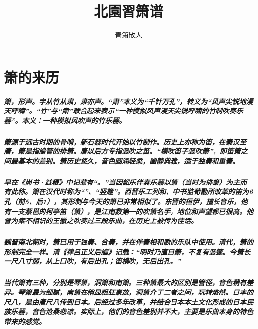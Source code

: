 \documentclass[cn,pad,twocol]{elegantbook}
\title{北園習箫谱}
\author{青箫散人}
\date{\zhtoday}
\begin{document}
\maketitle
\frontmatter
\tableofcontents
\mainmatter

\chapter{箫的来历}
\paragraph*{箫，形声。字从竹从肃，肃亦声。“肃”本义为“千针万孔”，转义为“风声尖锐地漫天呼啸”。“竹”与“肃”联合起来表示“一种模拟风声漫天尖锐呼啸的竹制吹奏乐器”。本义：一种模拟风吹声的竹乐器。}
\paragraph*{箫源于远古时期的骨哨，新石器时代开始以竹制作。历史上亦称为笛，在秦汉至唐，箫是指编管的排箫。唐以后方专指竖吹之笛。“横吹笛子竖吹箫”，即笛箫之间最基本的差别。箫历史悠久，音色圆润轻柔，幽静典雅，适于独奏和重奏。} 
\paragraph*{早在《尚书·益稷》中记载有“。”当因韶乐伴奏乐器以箫（当时为排箫）为主而有此称。箫在汉代时称为“”、“竖篴”。西晋乐工列和、中书监荀勖所改革的笛为6 孔（前5、后1），其形制与今天的箫已非常相似了。东晋的桓伊，擅长音乐，他有一支蔡邕的柯亭笛（箫），是江南数第一的吹箫名手，地位和声望都已很高。他曾为素不相识的王徽之吹奏过三段乐曲，在历史上被传为佳话。}
\paragraph*{魏晋南北朝时，箫已用于独奏、合奏，并在伴奏相和歌的乐队中使用。清代，箫的形制完全一样。清《律吕正义后编》记载：“明时乃直曰箫，不复有竖篴。今箫长一尺八寸弱，从上口吹，有后出孔；笛横吹，无后出孔。”}
\paragraph*{当代箫有三种，分别是琴箫，洞箫和南箫。三种箫最大的区别是管径，音色稍有差异。琴箫最为细腻，南箫在稍显粗狂豪放，洞箫介于二者之间，玩转悠然。日本的尺八，是由唐尺八传到日本。后经过多年改革，并结合日本本土文化形成的日本民族乐器，音色沧桑悲凉。实际上，他们的音色差别并不大，主要是乐曲本身的特色带来的感觉。}
\end{document}
